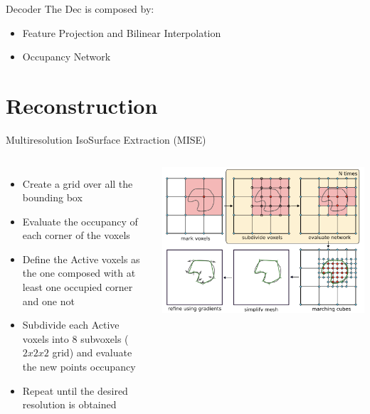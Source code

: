 \documentclass{beamer}
\begin{document}
\begin{frame}{Decoder}
The Dec is composed by:
\begin{itemize}
\item Feature Projection and Bilinear Interpolation
\item Occupancy Network
\end{itemize}
\end{frame}

\section{Reconstruction}

\begin{frame}{Multiresolution IsoSurface Extraction (MISE)}
    \begin{columns}[T]
        \begin{itemize}
            \item Create a grid over all the bounding box 
            \item Evaluate the occupancy of each corner of the voxels
            \item Define the Active voxels as the one composed with at least one occupied corner and one not 
            \item Subdivide each Active voxels into 8 subvoxels ($2x2x2$ grid) and evaluate the new points occupancy
            \item Repeat until the desired resolution is obtained
        \end{itemize}
        \includegraphics[width=\linewidth]{../media/mise.png}
    \end{columns}
  \end{frame}
\end{document}
